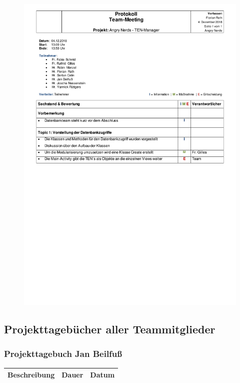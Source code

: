 \begin{figure}[H]
\centering
\begin{minipage}[t]{1\textwidth} %
\includegraphics[width=1\textwidth]{img/Protokoll2018-12-04.pdf}\\ %
\end{minipage}
\end{figure}

\subsection{Projekttagebücher aller Teammitglieder}
\subsubsection{Projekttagebuch Jan Beilfuß}
\begin{longtable}{|p{10cm}|p{2cm}|p{2cm}|}
\hline
{\textbf{Beschreibung}} & {\textbf{Dauer}} & {\textbf{Datum}} \\ \hline

\end{longtable}

